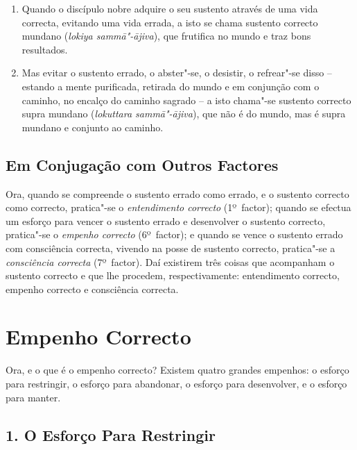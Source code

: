 \begin{enumerate}

  \item Quando o discípulo nobre adquire o seu sustento através de uma vida
        correcta, evitando uma vida errada, a isto se chama sustento correcto
        mundano (\emph{lokiya sammā"-ājiva}), que frutifica no mundo e traz bons
        resultados.

  \item Mas evitar o sustento errado, o abster"-se, o desistir, o refrear"-se
        disso -- estando a mente purificada, retirada do mundo e em conjunção
        com o caminho, no encalço do caminho sagrado -- a isto chama"-se sustento
        correcto supra mundano (\emph{lokuttara sammā"-ājiva}), que não é do
        mundo, mas é supra mundano e conjunto ao caminho.

\end{enumerate}

\subsection{Em Conjugação com Outros Factores}

Ora, quando se compreende o sustento errado como errado, e o sustento correcto
como correcto, pratica"-se o \emph{entendimento correcto} (1º~factor); quando se
efectua um esforço para vencer o sustento errado e desenvolver o sustento
correcto, pratica"-se o \emph{empenho correcto} (6º~factor); e quando se vence o
sustento errado com consciência correcta, vivendo na posse de sustento correcto,
pratica"-se a \emph{consciência correcta} (7º~factor). Daí existirem três coisas
que acompanham o sustento correcto e que lhe procedem, respectivamente:
entendimento correcto, empenho correcto e consciência correcta.


\section{Empenho Correcto}



Ora, e o que é o empenho correcto? Existem quatro grandes empenhos: o esforço
para restringir, o esforço para abandonar, o esforço para desenvolver, e o
esforço para manter.

\subsection{1. O Esforço Para Restringir}

